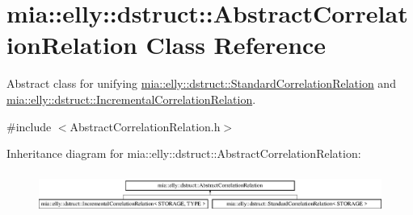 \hypertarget{classmia_1_1elly_1_1dstruct_1_1_abstract_correlation_relation}{\section{mia\-:\-:elly\-:\-:dstruct\-:\-:Abstract\-Correlation\-Relation Class Reference}
\label{classmia_1_1elly_1_1dstruct_1_1_abstract_correlation_relation}
}


Abstract class for unifying \hyperlink{classmia_1_1elly_1_1dstruct_1_1_standard_correlation_relation}{mia\-::elly\-::dstruct\-::\-Standard\-Correlation\-Relation} and \hyperlink{classmia_1_1elly_1_1dstruct_1_1_incremental_correlation_relation}{mia\-::elly\-::dstruct\-::\-Incremental\-Correlation\-Relation}.  




{\ttfamily \#include $<$Abstract\-Correlation\-Relation.\-h$>$}

Inheritance diagram for mia\-:\-:elly\-:\-:dstruct\-:\-:Abstract\-Correlation\-Relation\-:\begin{figure}[H]
\begin{center}
\leavevmode
\includegraphics[height=1.359223cm]{classmia_1_1elly_1_1dstruct_1_1_abstract_correlation_relation}
\end{center}
\end{figure}

